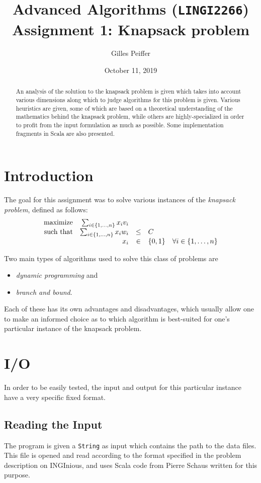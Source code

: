 \documentclass[journal]{IEEEtran}
\title{Advanced Algorithms (\texttt{LINGI2266}) \\ Assignment 1: Knapsack problem}
\author{Gilles Peiffer}
\date{October 11, 2019}
\newcommand{\scala}[1]{\texttt{#1}}
\begin{document}
\maketitle

\begin{abstract}
	An analysis of the solution to the knapsack problem is given which takes into account various dimensions along which to judge algorithms for this problem is given.
	Various heuristics are given, some of which are based on a theoretical understanding of the mathematics behind the knapsack problem, while others are highly-specialized in order to profit from the input formulation as much as possible.
	Some implementation fragments in Scala are also presented.
\end{abstract}

\section{Introduction}
\label{sec:intro}
The goal for this assignment was to solve various instances of the \emph{knapsack problem}, defined as follows:
\[
\begin{array}{rrcl@{\quad}l}
\textnormal{maximize} & \sum_{i \in \{1, \ldots, n\}} x_i v_i &&& \\
\textnormal{such that} & \sum_{i \in \{1, \ldots, n\}} x_i w_i & \le & C &\\
& x_i & \in & \{0, 1\} & \forall i \in \{1, \ldots, n\}
\end{array}
\]

Two main types of algorithms used to solve this class of problems are
\begin{itemize}
	\item \emph{dynamic programming} and
	\item \emph{branch and bound}.
\end{itemize}
Each of these has its own advantages and disadvantages, which usually allow one to make an informed choice as to which algorithm is best-suited for one's particular instance of the knapsack problem.

\section{I/O}
In order to be easily tested, the input and output for this particular instance have a very specific fixed format.
\subsection{Reading the Input}
The program is given a \scala{String} as input which contains the path to the data files.
This file is opened and read according to the format specified in the problem description on INGInious, and uses Scala code from Pierre Schaus written for this purpose.
\end{document}
